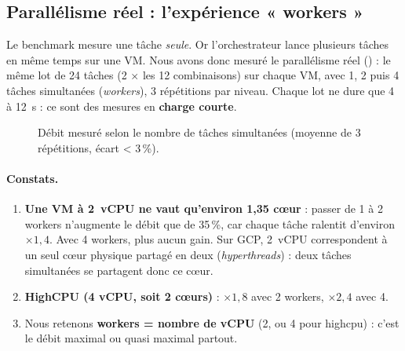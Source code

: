 \subsection{Parallélisme réel : l'expérience « workers »}
\label{sec:workers}

Le benchmark mesure une tâche \emph{seule}. Or l'orchestrateur lance plusieurs
tâches en même temps sur une VM. Nous avons donc mesuré le parallélisme réel
() : le même lot de 24 tâches (2 $\times$ les 12
combinaisons) sur chaque VM, avec 1, 2 puis 4 tâches simultanées
(\emph{workers}), 3 répétitions par niveau. Chaque lot ne dure que 4 à 12~s :
ce sont des mesures en \textbf{charge courte}.

\begin{figure}[H]
\centering
{}
\caption{Débit mesuré selon le nombre de tâches simultanées (moyenne de 3 répétitions, écart < 3\,\%).}
\label{fig:workers}
\end{figure}

\paragraph{Constats.}
\begin{enumerate}
  \item \textbf{Une VM à 2~vCPU ne vaut qu'environ 1,35 cœur} : passer de 1 à 2
        workers n'augmente le débit que de 35\,\%, car chaque tâche ralentit
        d'environ $\times 1{,}4$. Avec 4 workers, plus aucun gain. Sur GCP,
        2~vCPU correspondent à un seul cœur physique partagé en deux
        (\emph{hyperthreads}) : deux tâches simultanées se partagent donc ce cœur.
  \item \textbf{HighCPU (4 vCPU, soit 2 cœurs)} :
        $\times 1{,}8$ avec 2 workers, $\times 2{,}4$ avec 4.
  \item Nous retenons \textbf{workers = nombre de vCPU} (2, ou 4 pour highcpu) :
        c'est le débit maximal ou quasi maximal partout.
\end{enumerate}

